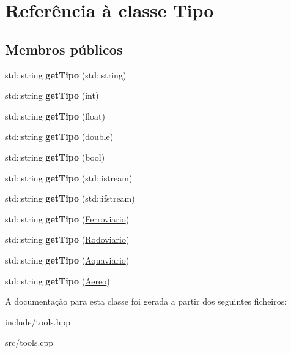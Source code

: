 \hypertarget{classTipo}{}\section{Referência à classe Tipo}
\label{classTipo}
\subsection*{Membros públicos}
\begin{DoxyCompactItemize}
\item 
\mbox{\label{classTipo_af9b29f32b08ccb79cd73c40647dd478e}} 
std\+::string {\bfseries get\+Tipo} (std\+::string)
\item 
\mbox{\label{classTipo_a7b536af2f1176260ac93826f6e0496d5}} 
std\+::string {\bfseries get\+Tipo} (int)
\item 
\mbox{\label{classTipo_aa4e0db513b8bcf4123194ff2a3162939}} 
std\+::string {\bfseries get\+Tipo} (float)
\item 
\mbox{\label{classTipo_a3b825f931075fe79bf40391501959e2c}} 
std\+::string {\bfseries get\+Tipo} (double)
\item 
\mbox{\label{classTipo_af2f0a674613d721de02573bcb215c717}} 
std\+::string {\bfseries get\+Tipo} (bool)
\item 
\mbox{\label{classTipo_aefcb4f38ef456184b1c4619b4ef257dd}} 
std\+::string {\bfseries get\+Tipo} (std\+::istream)
\item 
\mbox{\label{classTipo_a6bfafd7f52418a445b0c7679f7645f1d}} 
std\+::string {\bfseries get\+Tipo} (std\+::ifstream)
\item 
\mbox{\label{classTipo_a95147d03c5469a91b2ae7fef3a555fdb}} 
std\+::string {\bfseries get\+Tipo} (\hyperlink{classFerroviario}{Ferroviario})
\item 
\mbox{\label{classTipo_a7478760da0c6149211c42a197ae7158f}} 
std\+::string {\bfseries get\+Tipo} (\hyperlink{classRodoviario}{Rodoviario})
\item 
\mbox{\label{classTipo_a1b1444302127ac67c76c1b53564fa899}} 
std\+::string {\bfseries get\+Tipo} (\hyperlink{classAquaviario}{Aquaviario})
\item 
\mbox{\label{classTipo_a3857e585d7b97e481f450fb569ea1ec5}} 
std\+::string {\bfseries get\+Tipo} (\hyperlink{classAereo}{Aereo})
\end{DoxyCompactItemize}


A documentação para esta classe foi gerada a partir dos seguintes ficheiros\+:\begin{DoxyCompactItemize}
\item 
include/tools.\+hpp\item 
src/tools.\+cpp\end{DoxyCompactItemize}
